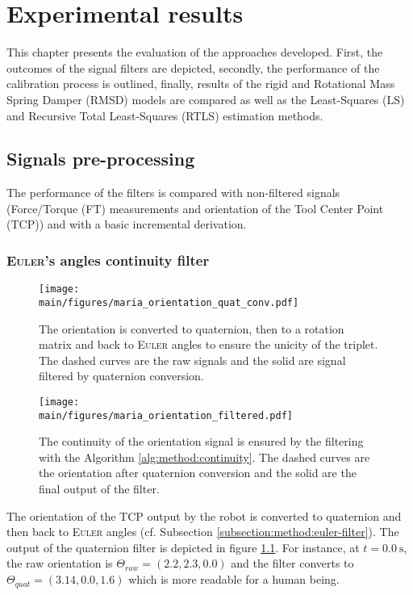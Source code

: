 \documentclass[/home/francois/latex/report/main.tex]{subfiles}
\begin{document}
\chapter{Experimental results}
\label{chapter:results}

This chapter presents the evaluation of the approaches developed. First, the outcomes of the signal filters are depicted, secondly, the performance of the calibration process is outlined, finally, results of the rigid and Rotational Mass Spring Damper (RMSD) models are compared as well as the Least-Squares (LS) and Recursive Total Least-Squares (RTLS) estimation methods.

\section{Signals pre-processing}
\label{section:results:pre-processing}

The performance of the filters is compared with non-filtered signals (Force/Torque (FT) measurements and orientation of the Tool Center Point (TCP)) and with a basic incremental derivation.

\subsection{\textsc{Euler}'s angles continuity filter}

\begin{figure}[h!]
  \centering
  \texttt{[image: \\main/figures/maria\_orientation\_quat\_conv.pdf]}
    \caption{The orientation is converted to quaternion, then to a rotation matrix and back to \textsc{Euler} angles to ensure the unicity of the triplet. The dashed curves are the raw signals and the solid are signal filtered by quaternion conversion.}
  \label{fig:results:quat-conv}
\end{figure}

\begin{figure}[h!]
  \centering
  \texttt{[image: \\main/figures/maria\_orientation\_filtered.pdf]}
  \caption{The continuity of the orientation signal is ensured by the filtering with the Algorithm \ref{alg:method:continuity}. The dashed curves are the orientation after quaternion conversion and the solid are the final output of the filter.}
  \label{fig:results:orientation-filtered}
\end{figure}

The orientation of the \ac{TCP} output by the robot is converted to quaternion and then back to \textsc{Euler} angles (cf. Subsection \ref{subsection:method:euler-filter}). The output of the quaternion filter is depicted in figure \ref{fig:results:quat-conv}. For instance, at $t = 0.0 \ \si{\second}$, the raw orientation is $\Theta_{raw} = (2.2, 2.3, 0.0)$ and the filter converts to  $\Theta_{quat} = (3.14, 0.0, 1.6)$ which is more readable for a human being.
\end{document}
